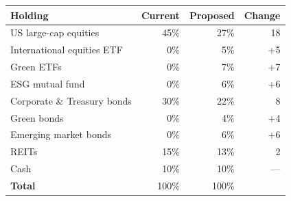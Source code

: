 \begin{tabular}{@{}lrrr@{}}
\toprule
\textbf{Holding} & \textbf{Current} & \textbf{Proposed} & \textbf{Change} \\
\midrule
US large-cap equities & 45\% & 27\% & \textminus{}18 \\
International equities ETF & 0\% & 5\% & +5 \\
Green ETFs & 0\% & 7\% & +7 \\
ESG mutual fund & 0\% & 6\% & +6 \\
Corporate \& Treasury bonds & 30\% & 22\% & \textminus{}8 \\
Green bonds & 0\% & 4\% & +4 \\
Emerging market bonds & 0\% & 6\% & +6 \\
REITs & 15\% & 13\% & \textminus{}2 \\
Cash & 10\% & 10\% & --- \\
\midrule
\textbf{Total} & 100\% & 100\% & \\
\bottomrule
\end{tabular}